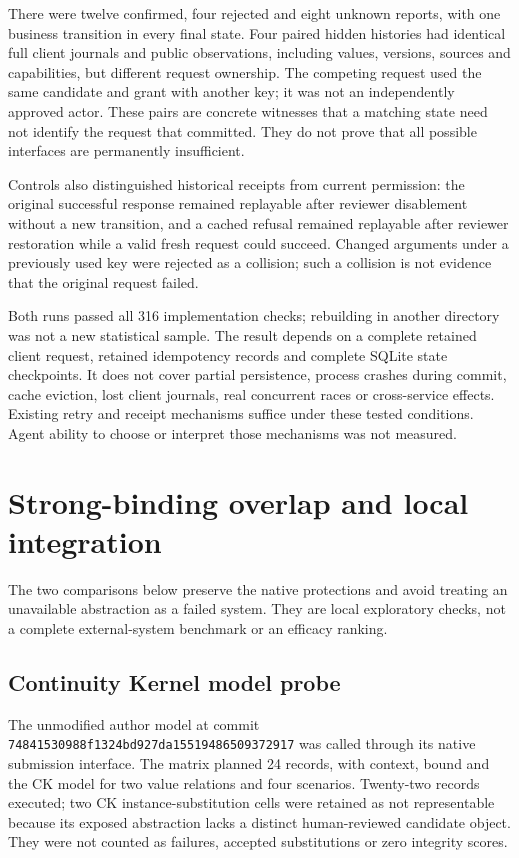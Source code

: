 \documentclass[10pt,a4paper]{article}
\begin{document}
There were twelve confirmed, four rejected and eight unknown reports, with one business transition in every final state. Four paired hidden histories had identical full client journals and public observations, including values, versions, sources and capabilities, but different request ownership. The competing request used the same candidate and grant with another key; it was not an independently approved actor. These pairs are concrete witnesses that a matching state need not identify the request that committed. They do not prove that all possible interfaces are permanently insufficient.

Controls also distinguished historical receipts from current permission: the original successful response remained replayable after reviewer disablement without a new transition, and a cached refusal remained replayable after reviewer restoration while a valid fresh request could succeed. Changed arguments under a previously used key were rejected as a collision; such a collision is not evidence that the original request failed.

Both runs passed all 316 implementation checks; rebuilding in another directory was not a new statistical sample. The result depends on a complete retained client request, retained idempotency records and complete SQLite state checkpoints. It does not cover partial persistence, process crashes during commit, cache eviction, lost client journals, real concurrent races or cross-service effects. Existing retry and receipt mechanisms suffice under these tested conditions. Agent ability to choose or interpret those mechanisms was not measured.

\section{Strong-binding overlap and local integration}
The two comparisons below preserve the native protections and avoid treating an unavailable abstraction as a failed system. They are local exploratory checks, not a complete external-system benchmark or an efficacy ranking.

\subsection*{Continuity Kernel model probe}
The unmodified author model at commit \nolinkurl{74841530988f1324bd927da15519486509372917} was called through its native submission interface. The matrix planned 24 records, with context, bound and the CK model for two value relations and four scenarios. Twenty-two records executed; two CK instance-substitution cells were retained as not representable because its exposed abstraction lacks a distinct human-reviewed candidate object. They were not counted as failures, accepted substitutions or zero integrity scores.
\end{document}
